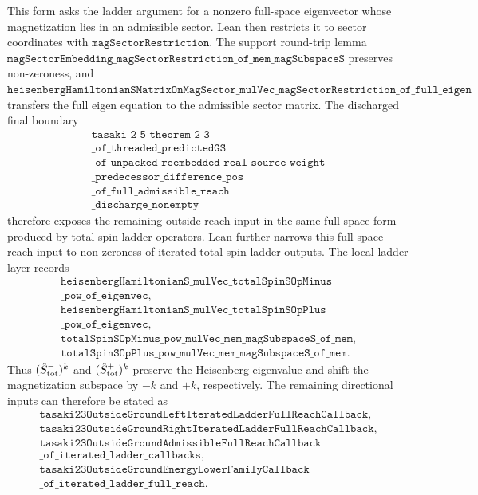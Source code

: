 \documentclass[a4paper,11pt]{article}
\begin{document}
This form asks the ladder argument for a nonzero full-space eigenvector
whose magnetization lies in an admissible sector.  Lean then restricts it
to sector coordinates with \(\texttt{magSectorRestriction}\).  The support
round-trip lemma
\(\texttt{magSectorEmbedding\_magSectorRestriction\_of\_mem\_magSubspaceS}\)
preserves non-zeroness, and
\(\texttt{heisenbergHamiltonianSMatrixOnMagSector\_mulVec\_magSectorRestriction\_of\_full\_eigen}\)
transfers the full eigen equation to the admissible sector matrix.  The
discharged final boundary
\[
\begin{gathered}
\texttt{tasaki\_2\_5\_theorem\_2\_3}\\
\texttt{\_of\_threaded\_predictedGS}\\
\texttt{\_of\_unpacked\_reembedded\_real\_source\_weight}\\
\texttt{\_predecessor\_difference\_pos}\\
\texttt{\_of\_full\_admissible\_reach}\\
\texttt{\_discharge\_nonempty}
\end{gathered}
\]
therefore exposes the remaining outside-reach input in the same
full-space form produced by total-spin ladder operators.
Lean further narrows this full-space reach input to non-zeroness of
iterated total-spin ladder outputs.  The local ladder layer records
\[
\begin{gathered}
\texttt{heisenbergHamiltonianS\_mulVec\_totalSpinSOpMinus}\\
\texttt{\_pow\_of\_eigenvec},\\
\texttt{heisenbergHamiltonianS\_mulVec\_totalSpinSOpPlus}\\
\texttt{\_pow\_of\_eigenvec},\\
\texttt{totalSpinSOpMinus\_pow\_mulVec\_mem\_magSubspaceS\_of\_mem},\\
\texttt{totalSpinSOpPlus\_pow\_mulVec\_mem\_magSubspaceS\_of\_mem}.
\end{gathered}
\]
Thus \((\hat S^-_{\rm tot})^k\) and \((\hat S^+_{\rm tot})^k\)
preserve the Heisenberg eigenvalue and shift the magnetization
subspace by \(-k\) and \(+k\), respectively.  The remaining directional
inputs can therefore be stated as
\[
\begin{gathered}
\texttt{tasaki23OutsideGroundLeftIteratedLadderFullReachCallback},\\
\texttt{tasaki23OutsideGroundRightIteratedLadderFullReachCallback},\\
\texttt{tasaki23OutsideGroundAdmissibleFullReachCallback}\\
\texttt{\_of\_iterated\_ladder\_callbacks},\\
\texttt{tasaki23OutsideGroundEnergyLowerFamilyCallback}\\
\texttt{\_of\_iterated\_ladder\_full\_reach}.
\end{gathered}
\]
\end{document}
